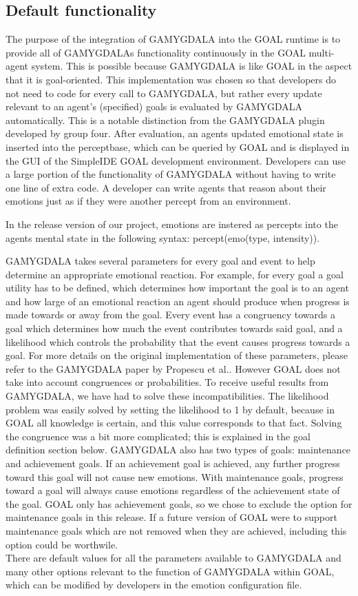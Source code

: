 \documentclass[11pt]{article}
\begin{document}
\subsection{Default functionality}
The purpose of the integration of GAMYGDALA\cite{GAMYGDALA} into the GOAL runtime is to provide all of GAMYGDALAs functionality continuously in the GOAL multi-agent system. This is possible because GAMYGDALA is like GOAL in the aspect that it is goal-oriented. This implementation was chosen so that developers do not need to code for every call to GAMYGDALA, but rather every update relevant to an agent's (specified) goals is evaluated by GAMYGDALA automatically. This is a notable distinction from the GAMYGDALA plugin developed by group four. After evaluation, an agents updated emotional state is inserted into the perceptbase, which can be queried by GOAL and is displayed in the GUI of the SimpleIDE GOAL development environment. Developers can use a large portion of the functionality of GAMYGDALA without having to write one line of extra code. A developer can write agents that reason about their emotions just as if they were another percept from an environment.

In the release version of our project, emotions are instered as percepts into the agents mental state in the following syntax: percept(emo(type, intensity)).

GAMYGDALA takes several parameters for every goal and event to help determine an appropriate emotional reaction. For example, for every goal a goal utility has to be defined, which determines how important the goal is to an agent and how large of an emotional reaction an agent should produce when progress is made towards or away from the goal. Every event has a congruency towards a goal which determines how much the event contributes towards said goal, and a likelihood which controls the probability that the event causes progress towards a goal. For more details on the original implementation of these parameters, please refer to the GAMYGDALA paper by Propescu et al.\cite{GAMYGDALA}. However GOAL does not take into account congruences or probabilities. To receive useful results from GAMYGDALA, we have had to solve these incompatibilities. The likelihood problem was easily solved by setting the likelihood to 1 by default, because in GOAL all knowledge is certain, and this value corresponds to that fact. Solving the congruence was a bit more complicated; this is explained in the goal definition section below.
GAMYGDALA also has two types of goals: maintenance and achievement goals. If an achievement goal is achieved, any further progress toward this goal will not cause new emotions. With maintenance goals, progress toward a goal will always cause emotions regardless of the achievement state of the goal. GOAL only has achievement goals, so we chose to exclude the option for maintenance goals in this release. If a future version of GOAL were to support maintenance goals which are not removed when they are achieved, including this option could be worthwile.\\
There are default values for all the parameters available to GAMYGDALA and many other options relevant to the function of GAMYGDALA within GOAL, which can be modified by developers in the emotion configuration file.
\end{document}
